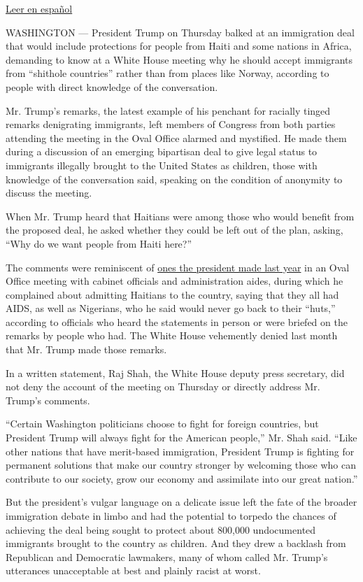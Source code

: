 \href{https://www.nytimes3xbfgragh.onion/es/2018/01/12/donald-trump-migantes-haiti-noruega/}{Leer
en español}

WASHINGTON --- President Trump on Thursday balked at an immigration deal
that would include protections for people from Haiti and some nations in
Africa, demanding to know at a White House meeting why he should accept
immigrants from ``shithole countries'' rather than from places like
Norway, according to people with direct knowledge of the conversation.

Mr. Trump's remarks, the latest example of his penchant for racially
tinged remarks denigrating immigrants, left members of Congress from
both parties attending the meeting in the Oval Office alarmed and
mystified. He made them during a discussion of an emerging bipartisan
deal to give legal status to immigrants illegally brought to the United
States as children, those with knowledge of the conversation said,
speaking on the condition of anonymity to discuss the meeting.

When Mr. Trump heard that Haitians were among those who would benefit
from the proposed deal, he asked whether they could be left out of the
plan, asking, ``Why do we want people from Haiti here?''

The comments were reminiscent of
\href{https://www.nytimes3xbfgragh.onion/2017/12/23/us/politics/trump-immigration.html}{ones
the president made last year} in an Oval Office meeting with cabinet
officials and administration aides, during which he complained about
admitting Haitians to the country, saying that they all had AIDS, as
well as Nigerians, who he said would never go back to their ``huts,''
according to officials who heard the statements in person or were
briefed on the remarks by people who had. The White House vehemently
denied last month that Mr. Trump made those remarks.

In a written statement, Raj Shah, the White House deputy press
secretary, did not deny the account of the meeting on Thursday or
directly address Mr. Trump's comments.

``Certain Washington politicians choose to fight for foreign countries,
but President Trump will always fight for the American people,'' Mr.
Shah said. ``Like other nations that have merit-based immigration,
President Trump is fighting for permanent solutions that make our
country stronger by welcoming those who can contribute to our society,
grow our economy and assimilate into our great nation.''

But the president's vulgar language on a delicate issue left the fate of
the broader immigration debate in limbo and had the potential to torpedo
the chances of achieving the deal being sought to protect about 800,000
undocumented immigrants brought to the country as children. And they
drew a backlash from Republican and Democratic lawmakers, many of whom
called Mr. Trump's utterances unacceptable at best and plainly racist at
worst.

